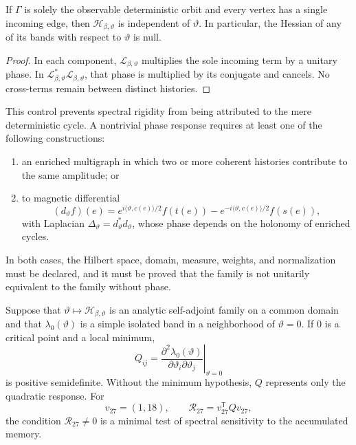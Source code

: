 \begin{proposition}
\label{prop:control-negativo-espectral-determinista}
If \(\Gamma\) is solely the observable deterministic orbit and every vertex
has a single incoming edge, then
\(\mathcal H_{\beta,\vartheta}\) is independent of \(\vartheta\). In
particular, the Hessian of any of its bands with respect to
\(\vartheta\) is null.
\end{proposition}

\begin{proof}
In each component, \(\mathcal L_{\beta,\vartheta}\) multiplies the sole
incoming term by a unitary phase. In
\(\mathcal L_{\beta,\vartheta}^{*}\mathcal L_{\beta,\vartheta}\), that phase
is multiplied by its conjugate and cancels. No cross-terms remain
between distinct histories.
\end{proof}

This control prevents spectral rigidity from being attributed to the mere deterministic cycle.
A nontrivial phase response requires at least one of the following
constructions:
\begin{enumerate}
 \item an enriched multigraph in which two or more coherent histories
 contribute to the same amplitude; or
 \item to magnetic differential
 \[
  (d_\vartheta f)(e)
  =
  e^{i\langle\vartheta,c(e)\rangle/2}f(t(e))
  -
  e^{-i\langle\vartheta,c(e)\rangle/2}f(s(e)),
 \]
 with Laplacian
 \(\Delta_\vartheta=d_\vartheta^*d_\vartheta\), whose phase depends on the
 holonomy of enriched cycles.
\end{enumerate}
In both cases, the Hilbert space, domain, measure,
weights, and normalization must be declared, and it must be proved that the family is not
unitarily equivalent to the family without phase.

Suppose that
\(\vartheta\mapsto\mathcal H_{\beta,\vartheta}\) is an analytic self-adjoint family on a common domain and that
\(\lambda_0(\vartheta)\) is a simple isolated band in a neighborhood of
\(\vartheta=0\). If \(0\) is a critical point and a local minimum,
\[
 Q_{ij}
 =
 \left.
 \frac{\partial^2\lambda_0(\vartheta)}
      {\partial\vartheta_i\partial\vartheta_j}
 \right|_{\vartheta=0}
\]
is positive semidefinite. Without the minimum hypothesis, \(Q\) represents only
the quadratic response. For
\[
 v_{27}=(1,18),
 \qquad
 \mathcal R_{27}=v_{27}^{\mathsf T}Qv_{27},
\]
the condition \(\mathcal R_{27}\neq0\) is a minimal test of spectral
sensitivity to the accumulated memory.

